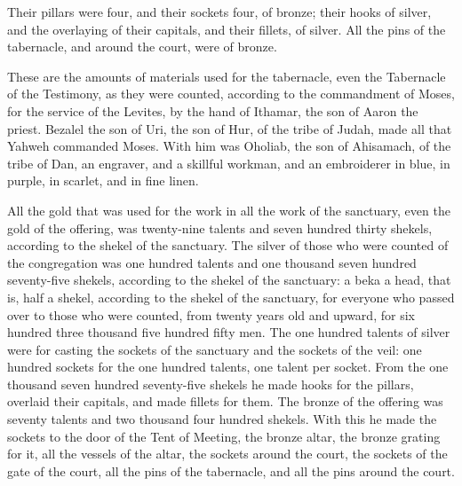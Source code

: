 {Their pillars were four, and their sockets four, of bronze; their hooks of silver, and the overlaying of their capitals, and their fillets, of silver.
All the pins of the tabernacle, and around the court, were of bronze.
\par }{\PP {}These are the amounts of materials used for the tabernacle, even the Tabernacle of the Testimony, as they were counted, according to the commandment of Moses, for the service of the Levites, by the hand of Ithamar, the son of Aaron the priest.
Bezalel the son of Uri, the son of Hur, of the tribe of Judah, made all that Yahweh commanded Moses.
With him was Oholiab, the son of Ahisamach, of the tribe of Dan, an engraver, and a skillful workman, and an embroiderer in blue, in purple, in scarlet, and in fine linen.
\par }{\PP {}All the gold that was used for the work in all the work of the sanctuary, even the gold of the offering, was twenty-nine talents and seven hundred thirty shekels, according to the shekel of the sanctuary.
The silver of those who were counted of the congregation was one hundred talents and one thousand seven hundred seventy-five shekels, according to the shekel of the sanctuary:
a beka a head, that is, half a shekel, according to the shekel of the sanctuary, for everyone who passed over to those who were counted, from twenty years old and upward, for six hundred three thousand five hundred fifty men.
The one hundred talents of silver were for casting the sockets of the sanctuary and the sockets of the veil: one hundred sockets for the one hundred talents, one talent per socket.
From the one thousand seven hundred seventy-five shekels he made hooks for the pillars, overlaid their capitals, and made fillets for them.
The bronze of the offering was seventy talents and two thousand four hundred shekels.
With this he made the sockets to the door of the Tent of Meeting, the bronze altar, the bronze grating for it, all the vessels of the altar,
the sockets around the court, the sockets of the gate of the court, all the pins of the tabernacle, and all the pins around the court.

}
